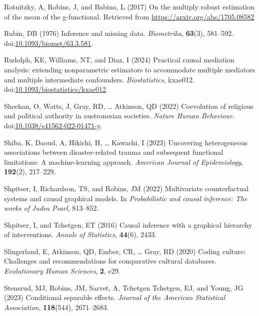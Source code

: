 \documentclass[
  single column]{article}
\newlength{\cslhangindent}
\newenvironment{CSLReferences}[2] %
 {\begin{list}{}{%
  \setlength{\itemindent}{0pt}
  \setlength{\leftmargin}{0pt}
  \setlength{\parsep}{0pt}
  \ifodd #1
   \setlength{\leftmargin}{\cslhangindent}
   \setlength{\itemindent}{-1\cslhangindent}
  \fi
  \setlength{\itemsep}{#2\baselineskip}}}
 {\end{list}}
\begin{document}
\begin{CSLReferences}{1}{0}
Rotnitzky, A, Robins, J, and Babino, L (2017) On the multiply robust
estimation of the mean of the g-functional. Retrieved from
\url{https://arxiv.org/abs/1705.08582}

Rubin, DB (1976) Inference and missing data. \emph{Biometrika},
\textbf{63}(3), 581--592.
doi:\href{https://doi.org/10.1093/biomet/63.3.581}{10.1093/biomet/63.3.581}.

Rudolph, KE, Williams, NT, and Diaz, I (2024) {Practical causal
mediation analysis: extending nonparametric estimators to accommodate
multiple mediators and multiple intermediate confounders}.
\emph{Biostatistics}, kxae012.
doi:\href{https://doi.org/10.1093/biostatistics/kxae012}{10.1093/biostatistics/kxae012}.

Sheehan, O, Watts, J, Gray, RD, \ldots{} Atkinson, QD (2022) Coevolution
of religious and political authority in austronesian societies.
\emph{Nature Human Behaviour}.
doi:\href{https://doi.org/10.1038/s41562-022-01471-y}{10.1038/s41562-022-01471-y}.

Shiba, K, Daoud, A, Hikichi, H, \ldots{} Kawachi, I (2023) Uncovering
heterogeneous associations between disaster-related trauma and
subsequent functional limitations: A machine-learning approach.
\emph{American Journal of Epidemiology}, \textbf{192}(2), 217--229.

Shpitser, I, Richardson, TS, and Robins, JM (2022) Multivariate
counterfactual systems and causal graphical models. In
\emph{Probabilistic and causal inference: The works of {J}udea {P}earl},
813--852.

Shpitser, I, and Tchetgen, ET (2016) Causal inference with a graphical
hierarchy of interventions. \emph{Annals of Statistics}, \textbf{44}(6),
2433.

Slingerland, E, Atkinson, QD, Ember, CR, \ldots{} Gray, RD (2020) Coding
culture: Challenges and recommendations for comparative cultural
databases. \emph{Evolutionary Human Sciences}, \textbf{2}, e29.

Stensrud, MJ, Robins, JM, Sarvet, A, Tchetgen Tchetgen, EJ, and Young,
JG (2023) Conditional separable effects. \emph{Journal of the American
Statistical Association}, \textbf{118}(544), 2671--2683.


\end{CSLReferences}
\end{document}
